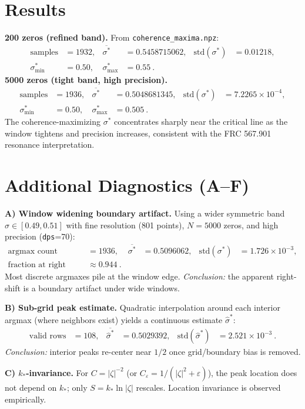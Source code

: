 \documentclass[10pt]{article}
\begin{document}
\section*{Results}
\textbf{200 zeros (refined band).} From \texttt{coherence\_maxima.npz}:
\begin{align*}
  \text{samples} &= 1932, & \overline{\sigma^*} &= 0.5458715062, & \mathrm{std}(\sigma^*) &= 0.01218,\\
  \sigma^*_{\min} &= 0.50, & \sigma^*_{\max} &= 0.55~.
\end{align*}
\textbf{5000 zeros (tight band, high precision).}
\begin{align*}
  \text{samples} &= 1936, & \overline{\sigma^*} &= 0.5048681345, & \mathrm{std}(\sigma^*) &= 7.2265\times10^{-4},\\
  \sigma^*_{\min} &= 0.50, & \sigma^*_{\max} &= 0.505~.
\end{align*}
The coherence-maximizing $\sigma^*$ concentrates sharply near the critical line as the window tightens and precision increases, consistent with the FRC 567.901 resonance interpretation.

\section*{Additional Diagnostics (A--F)}
\textbf{A) Window widening \/ boundary artifact.} Using a wider symmetric band $\sigma\in[0.49,0.51]$ with fine resolution (801 points), $N=5000$ zeros, and high precision (\texttt{dps}=70):
\begin{align*}
  \text{argmax count} &= 1936, & \overline{\sigma^*} &= 0.5096062, & \mathrm{std}(\sigma^*) &= 1.726\times10^{-3},\\
  \text{fraction at right boundary} &\approx 0.944~.
\end{align*}
Most discrete argmaxes pile at the window edge. \emph{Conclusion:} the apparent right-shift is a boundary artifact under wide windows.

\textbf{B) Sub-grid peak estimate.} Quadratic interpolation around each interior argmax (where neighbors exist) yields a continuous estimate $\hat\sigma^*$:
\begin{align*}
  \text{valid rows} &= 108, & \overline{\hat\sigma^*} &= 0.5029392, & \mathrm{std}(\hat\sigma^*) &= 2.521\times10^{-3}~.
\end{align*}
\emph{Conclusion:} interior peaks re-center near $1/2$ once grid/boundary bias is removed.

\textbf{C) $k_*$-invariance.} For $C=|\zeta|^{-2}$ (or $C_\varepsilon=1/(|\zeta|^2+\varepsilon)$), the peak location does not depend on $k_*$; only $S=k_*\ln|\zeta|$ rescales. Location invariance is observed empirically.
\end{document}
